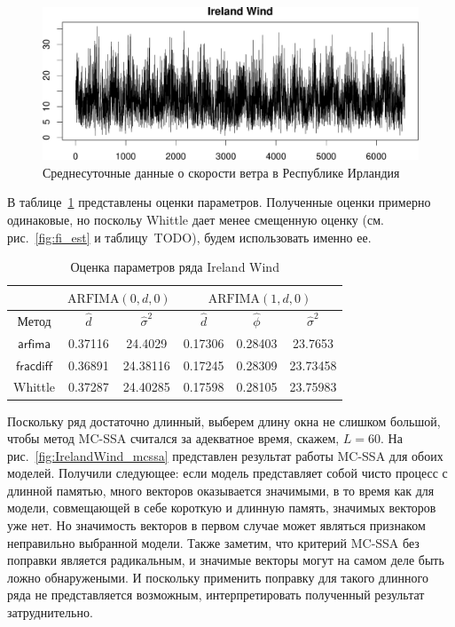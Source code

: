 \documentclass[specialist,
substylefile = spbu_report.rtx,
subf,href,colorlinks=true, 12pt]{disser}
\theoremstyle{definition}
\begin{document}
\begin{figure}[h]
	\centering
	\includegraphics[width=\textwidth]{img/IrelandWind_ts.pdf}
	\caption{Среднесуточные данные о скорости ветра в Республике Ирландия}
	\label{fig:IrelandWind_ts}
\end{figure}

В таблице~\ref{tab:IrelandWind_est} представлены оценки параметров. Полученные оценки примерно одинаковые, но поскольу Whittle дает менее смещенную оценку (см. рис.~\ref{fig:fi_est} и таблицу~TODO), будем использовать именно ее.

\begin{table}[b]
	\centering
	\caption{Оценка параметров ряда Ireland Wind}
	\label{tab:IrelandWind_est}
	\begin{tabular}{|c|c|c|c|c|c|}
		\cline{2-6}
		\multicolumn{1}{c|}{} & \multicolumn{2}{c|}{$\mathrm{ARFIMA}(0, d, 0)$} & \multicolumn{3}{c|}{$\mathrm{ARFIMA}(1, d, 0)$} \\
		\hline
		Метод & $\hat d$ & $\hat\sigma^2$ & $\hat{d}$ & $\hat\phi$ & $\hat{\sigma}^2$ \\
		\hline
		$\mathsf{arfima}$ & 0.37116 & 24.4029 & 0.17306 & 0.28403 & 23.7653 \\
		$\mathsf{fracdiff}$ & 0.36891 & 24.38116 & 0.17245 & 0.28309 & 23.73458 \\
		Whittle & 0.37287 & 24.40285 & 0.17598 & 0.28105 & 23.75983 \\
		\hline
	\end{tabular}
\end{table}

Поскольку ряд достаточно длинный, выберем длину окна не слишком большой, чтобы метод MC-SSA считался за адекватное время, скажем, $L=60$. На рис.~\ref{fig:IrelandWind_mcssa} представлен результат работы MC-SSA для обоих моделей. Получили следующее: если модель представляет собой чисто процесс с длинной памятью, много векторов оказывается значимыми, в то время как для модели, совмещающей в себе короткую и длинную память, значимых векторов уже нет. Но значимость векторов в первом случае может являться признаком неправильно выбранной модели. Также заметим, что критерий MC-SSA без поправки является радикальным, и значимые векторы могут на самом деле быть ложно обнаружеными. И поскольку применить поправку для такого длинного ряда не представляется возможным, интерпретировать полученный результат затруднительно. 
\end{document}
